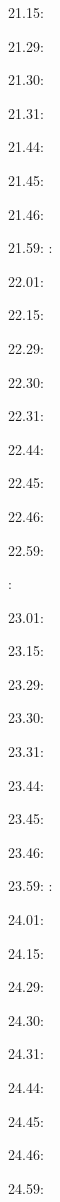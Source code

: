 \documentclass[italian]{article}
\begin{document}
21.15:      

21.29:      

21.30:     

21.31:     

21.44:     

21.45:     

21.46:     

21.59:     
:    

22.01:      

22.15:      

22.29:      

22.30:     

22.31:     

22.44:     

22.45:     

22.46:     

22.59:     

:    

23.01:      

23.15:      

23.29:      

23.30:     

23.31:     

23.44:     

23.45:     

23.46:     

23.59:     
:    

24.01:      

24.15:      

24.29:      

24.30:     

24.31:     

24.44:     

24.45:     

24.46:     

24.59:     
\end{document}
